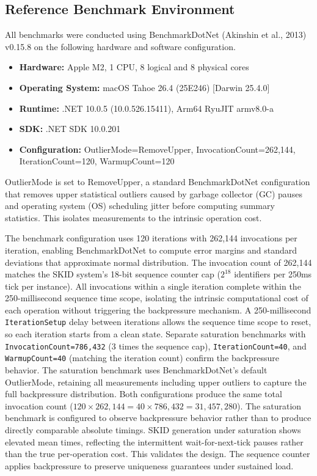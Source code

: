 \documentclass[fleqn,10pt,lineno]{wlpeerj}
\providecommand{\tightlist}{%
  \setlength{\itemsep}{0pt}\setlength{\parskip}{0pt}}
\begin{document}
\subsection{Reference Benchmark
Environment}\label{reference-benchmark-environment}

All benchmarks were conducted using BenchmarkDotNet ({Akinshin et al.},
2013) v0.15.8 on the following hardware and software configuration.

\begin{itemize}
\tightlist
\item
  \textbf{Hardware:} Apple M2, 1 CPU, 8 logical and 8 physical cores
\item
  \textbf{Operating System:} macOS Tahoe 26.4 (25E246) {[}Darwin
  25.4.0{]}
\item
  \textbf{Runtime:} .NET 10.0.5 (10.0.526.15411), Arm64 RyuJIT armv8.0-a
\item
  \textbf{SDK:} .NET SDK 10.0.201
\item
  \textbf{Configuration:} OutlierMode=RemoveUpper,
  InvocationCount=262,144, IterationCount=120, WarmupCount=120
\end{itemize}

OutlierMode is set to RemoveUpper, a standard BenchmarkDotNet
configuration that removes upper statistical outliers caused by garbage
collector (GC) pauses and operating system (OS) scheduling jitter before
computing summary statistics. This isolates measurements to the
intrinsic operation cost.

The benchmark configuration uses 120 iterations with 262,144 invocations
per iteration, enabling BenchmarkDotNet to compute error margins and
standard deviations that approximate normal distribution. The invocation
count of 262,144 matches the SKID system's 18-bit sequence counter cap
(\(2^{18}\) identifiers per 250ms tick per instance). All invocations
within a single iteration complete within the 250-millisecond sequence
time scope, isolating the intrinsic computational cost of each operation
without triggering the backpressure mechanism. A 250-millisecond
\texttt{IterationSetup} delay between iterations allows the sequence
time scope to reset, so each iteration starts from a clean state.
Separate saturation benchmarks with \texttt{InvocationCount=786,432} (3
times the sequence cap), \texttt{IterationCount=40}, and
\texttt{WarmupCount=40} (matching the iteration count) confirm the
backpressure behavior. The saturation benchmark uses BenchmarkDotNet's
default OutlierMode, retaining all measurements including upper outliers
to capture the full backpressure distribution. Both configurations
produce the same total invocation count
(\(120 \times 262{,}144 = 40 \times 786{,}432 = 31{,}457{,}280\)). The
saturation benchmark is configured to observe backpressure behavior
rather than to produce directly comparable absolute timings. SKID
generation under saturation shows elevated mean times, reflecting the
intermittent wait-for-next-tick pauses rather than the true
per-operation cost. This validates the design. The sequence counter
applies backpressure to preserve uniqueness guarantees under sustained
load.
\end{document}
